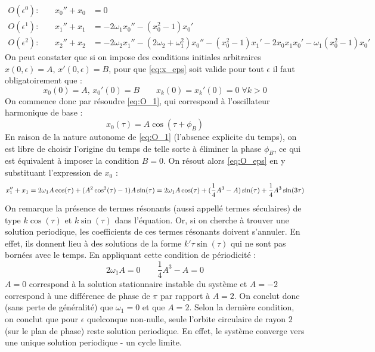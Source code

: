 %
\begin{align}
    \label{eq:O_1}
    O(\epsilon^0)\text{:}\qquad      x_0'' + x_0 &= 0  \\
    \label{eq:O_eps}
    O(\epsilon^1)\text{:}\qquad      x_1'' + x_1 &= -2\omega_1 x_0'' - (x_0^2 - 1)x_0' \\
    \label{eq:O_eps2}
    O(\epsilon^2)\text{:}\qquad      x_2'' + x_2 &= -2\omega_2 x_1'' - (2\omega_2 + \omega_1^2)x_0'' - (x_0^2 - 1)x_1' - 2x_0 x_1 x_0' - \omega_1(x_0^2 - 1)x_0'
\end{align}
%
%
On peut constater que si on impose des conditions initiales arbitraires $x(0, \epsilon)=A,  \, x'(0, \epsilon)=B$, pour que \eqref{eq:x_eps} 
soit valide pour tout $\epsilon$ il faut obligatoirement que :
%
\begin{equation}
    x_0(0) = A,\, x_0'(0) = B
    \qquad
    x_k(0) = x_k'(0) = 0 \; \forall k > 0
\end{equation}
%
On commence donc par résoudre \eqref{eq:O_1}, qui correspond à l'oscillateur harmonique de base :
%
\begin{equation}
    x_0(\tau) = A \cos(\tau + \phi_B)
\end{equation}
%
En raison de la nature autonome de \eqref{eq:O_1} (l'absence explicite du temps), on est libre de choisir l'origine du temps de telle sorte à éliminer la phase $\phi_B$, 
ce qui est équivalent à imposer la condition $B = 0$. On résout alors \eqref{eq:O_eps} en y substituant l’expression de $x_0$ :
%
\begin{dmath}
    x_1'' + x_1 = 2\omega_1 A \cos(\tau) + (A^2 \cos^2(\tau) - 1)A\sin(\tau) \\
    = 2\omega_1 A \cos(\tau) + (\frac{1}{4}A^3 - A)\sin(\tau) + \frac{1}{4}A^3 \sin(3\tau)
\end{dmath}
%
On remarque la présence de termes résonants (aussi appellé termes séculaires) de type $k\cos(\tau)$ et $k\sin(\tau)$ dans l'équation. 
Or, si on cherche à trouver une solution periodique, les coefficients de ces termes résonants doivent s'annuler.
En effet, ils donnent lieu à des solutions de la forme $k' \tau \sin(\tau)$ qui ne sont pas bornées avec le temps.
En appliquant cette condition de périodicité :
%
\begin{equation}
    2\omega_1 A  = 0
    \qquad
    \frac{1}{4}A^3 - A = 0
\end{equation}
%
$A=0$ correspond à la solution stationnaire instable du système et $A=-2$ correspond à une différence de phase de $\pi$ par rapport à $A=2$. On conclut donc (sans perte de généralité) que $\omega_1 = 0$ et que $A=2$. 
Selon la dernière condition, on conclut que pour $\epsilon$ quelconque non-nulle, seule l'orbite circulaire de rayon $2$ (sur le plan de phase) reste solution periodique.
En effet, le système converge vers une unique solution periodique - un cycle limite.

